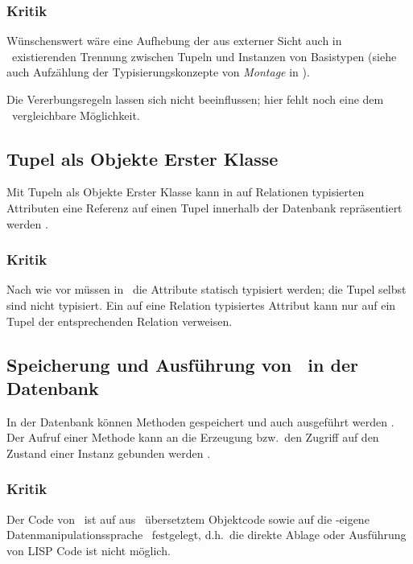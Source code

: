 \subsubsection{Kritik}
%
W\"{u}nschenswert w\"{a}re eine Aufhebung der aus externer Sicht auch in
\postgres\ existierenden Trennung zwischen Tupeln und Instanzen von
Basistypen (siehe auch Aufz\"{a}hlung der Typisierungskonzepte von
{\em Montage\/} in \cite[]{bib:on94}).
%
\par{}Die Vererbungsregeln lassen sich nicht beeinflussen; hier fehlt
noch eine dem \mop\ vergleichbare M\"{o}glichkeit.
%
\subsection{Tupel als Objekte Erster Klasse}
%
Mit Tupeln als Objekte Erster Klasse kann in auf Relationen
typisierten Attributen eine Referenz auf einen Tupel innerhalb der
Datenbank repr\"{a}sentiert werden \cite[]{bib:on94}.
%
\subsubsection{Kritik}
%
Nach wie vor m\"{u}ssen in \postgres\ die Attribute statisch typisiert
werden; die Tupel selbst sind nicht typisiert.  Ein auf eine Relation
typisiertes Attribut kann nur auf ein Tupel der entsprechenden
Relation verweisen.
%
\subsection{Speicherung und Ausf\"{u}hrung von \protect\mtd[n]\ in der
Datenbank}
%
In der Datenbank k\"{o}nnen Methoden gespeichert und auch ausgef\"{u}hrt
werden \cite[]{bib:rh93} \cite[]{bib:we93}.
Der Aufruf einer Methode kann an die Erzeugung bzw.\ den Zugriff auf
den Zustand einer Instanz gebunden werden
\cite[]{bib:we93}.
%
\subsubsection{Kritik}
%
Der Code von \mtd[n]\ ist auf aus \clogo\ \"{u}bersetztem Objektcode
sowie auf die \postgres-eigene Datenmanipulationssprache
\postquel\ festgelegt, d.h.\ die direkte Ablage oder Ausf\"{u}hrung von
LISP Code ist nicht m\"{o}glich.
%
